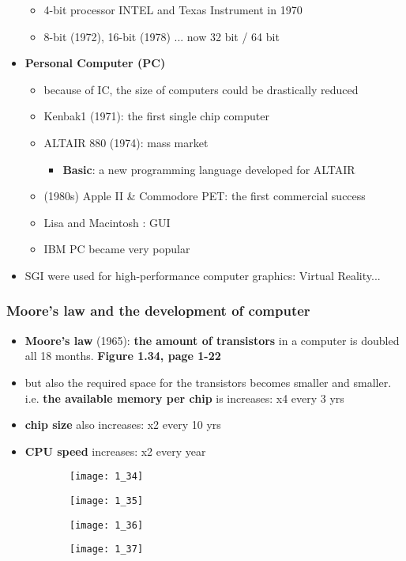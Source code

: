 \documentclass{standalone}
\begin{document}
\begin{itemize}
		\begin{itemize}
			\item 4-bit processor INTEL and Texas Instrument in 1970
			\item 8-bit (1972), 16-bit (1978) ... now 32 bit / 64 bit
		\end{itemize}
	\item \textbf{Personal Computer (PC)}
		\begin{itemize}
			\item because of IC, the size of computers could be drastically reduced
			\item Kenbak1 (1971): the first single chip computer
			\item ALTAIR 880 (1974): mass market
				\begin{itemize}
					\item \textbf{Basic}: a new programming language developed for ALTAIR
				\end{itemize}
			\item (1980s) Apple II \& Commodore PET: the first commercial success
			\item Lisa and Macintosh : GUI
			\item IBM PC became very popular
		\end{itemize}
	\item SGI were used for high-performance computer graphics: Virtual Reality...
\end{itemize}

\subsubsection*{Moore's law and the development of computer}

\begin{itemize}
	\item \textbf{Moore's law} (1965): \textbf{the amount of transistors} in a computer is doubled all 18 months. \textbf{Figure 1.34, page 1-22}
	\item but also the required space for the transistors becomes smaller and smaller. i.e. \textbf{the available memory per chip} is increases: x4 every 3 yrs
	\item \textbf{chip size} also increases: x2 every 10 yrs 
	\item \textbf{CPU speed} increases: x2 every year
\end{itemize}

\begin{figure}[h]
	\centering
	\begin{subfigure}[b]{0.45\textwidth}
		\texttt{[image: 1\_34]}
	\end{subfigure}
	\begin{subfigure}[b]{0.45\textwidth}
		\texttt{[image: 1\_35]}
	\end{subfigure}
	\begin{subfigure}[b]{0.45\textwidth}
		\texttt{[image: 1\_36]}
	\end{subfigure}
	\begin{subfigure}[b]{0.45\textwidth}
		\texttt{[image: 1\_37]}
	\end{subfigure}
\end{figure}
\end{document}
